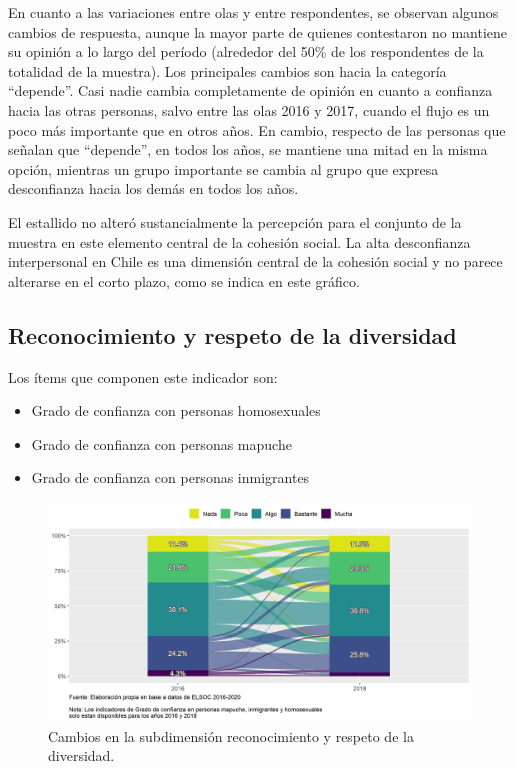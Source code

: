 \documentclass[
  12pt,
]{book}
\begin{document}
En cuanto a las variaciones entre olas y entre respondentes, se observan algunos cambios de respuesta, aunque la mayor parte de quienes contestaron no mantiene su opinión a lo largo del período (alrededor del 50\% de los respondentes de la totalidad de la muestra). Los principales cambios son hacia la categoría ``depende''. Casi nadie cambia completamente de opinión en cuanto a confianza hacia las otras personas, salvo entre las olas 2016 y 2017, cuando el flujo es un poco más importante que en otros años. En cambio, respecto de las personas que señalan que ``depende'', en todos los años, se mantiene una mitad en la misma opción, mientras un grupo importante se cambia al grupo que expresa desconfianza hacia los demás en todos los años.

El estallido no alteró sustancialmente la percepción para el conjunto de la muestra en este elemento central de la cohesión social. La alta desconfianza interpersonal en Chile es una dimensión central de la cohesión social y no parece alterarse en el corto plazo, como se indica en este gráfico.

\hypertarget{reconocimiento-y-respeto-de-la-diversidad}{%
\subsection{Reconocimiento y respeto de la diversidad}\label{reconocimiento-y-respeto-de-la-diversidad}}

Los ítems que componen este indicador son:

\begin{itemize}
\item
  Grado de confianza con personas homosexuales
\item
  Grado de confianza con personas mapuche
\item
  Grado de confianza con personas inmigrantes
\end{itemize}

\begin{figure}[H]

{\centering \includegraphics[width=1\linewidth,height=1\textheight]{output/graphs/alluvial_diversidad} 

}

\caption{Cambios en la subdimensión reconocimiento y respeto de la diversidad.}\label{fig:alluvial-diversidad}
\end{figure}
\end{document}
